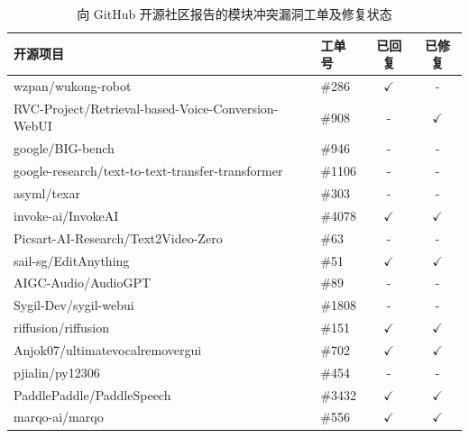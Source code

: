 \begin{table}[htbp]
\centering
\small %
\renewcommand{\arraystretch}{1.3} %
\caption{向 GitHub 开源社区报告的模块冲突漏洞工单及修复状态}
\label{tab:reported_issues}
\begin{tabular}{l l c c }
\hline
\cellcolor[HTML]{C0C0C0}\textbf{开源项目} & \cellcolor[HTML]{C0C0C0}\textbf{工单号} & \cellcolor[HTML]{C0C0C0}\textbf{已回复} & \cellcolor[HTML]{C0C0C0}\textbf{已修复} \\ \hline
wzpan/wukong-robot & \#286 & $\checkmark$ & - \\
\cellcolor[HTML]{EFEFEF}RVC-Project/Retrieval-based-Voice-Conversion-WebUI & \cellcolor[HTML]{EFEFEF}\#908 & \cellcolor[HTML]{EFEFEF}- & \cellcolor[HTML]{EFEFEF}$\checkmark$ \\
google/BIG-bench & \#946 & - & - \\
\cellcolor[HTML]{EFEFEF}google-research/text-to-text-transfer-transformer & \cellcolor[HTML]{EFEFEF}\#1106 & \cellcolor[HTML]{EFEFEF}- & \cellcolor[HTML]{EFEFEF}- \\
asyml/texar & \#303 & - & - \\
\cellcolor[HTML]{EFEFEF}invoke-ai/InvokeAI & \cellcolor[HTML]{EFEFEF}\#4078 & \cellcolor[HTML]{EFEFEF}$\checkmark$ & \cellcolor[HTML]{EFEFEF}$\checkmark$ \\
Picsart-AI-Research/Text2Video-Zero & \#63 & - & - \\
\cellcolor[HTML]{EFEFEF}sail-sg/EditAnything & \cellcolor[HTML]{EFEFEF}\#51 & \cellcolor[HTML]{EFEFEF}$\checkmark$ & \cellcolor[HTML]{EFEFEF}$\checkmark$ \\
AIGC-Audio/AudioGPT & \#89 & - & - \\
\cellcolor[HTML]{EFEFEF}Sygil-Dev/sygil-webui & \cellcolor[HTML]{EFEFEF}\#1808 & \cellcolor[HTML]{EFEFEF}- & \cellcolor[HTML]{EFEFEF}- \\
riffusion/riffusion & \#151 & $\checkmark$ & $\checkmark$ \\
\cellcolor[HTML]{EFEFEF}Anjok07/ultimatevocalremovergui & \cellcolor[HTML]{EFEFEF}\#702 & \cellcolor[HTML]{EFEFEF}$\checkmark$ & \cellcolor[HTML]{EFEFEF}$\checkmark$ \\
pjialin/py12306 & \#454 & - & - \\
\cellcolor[HTML]{EFEFEF}PaddlePaddle/PaddleSpeech & \cellcolor[HTML]{EFEFEF}\#3432 & \cellcolor[HTML]{EFEFEF}$\checkmark$ & \cellcolor[HTML]{EFEFEF}$\checkmark$ \\
marqo-ai/marqo & \#556 & $\checkmark$ & $\checkmark$ \\

\end{tabular}
\end{table}
